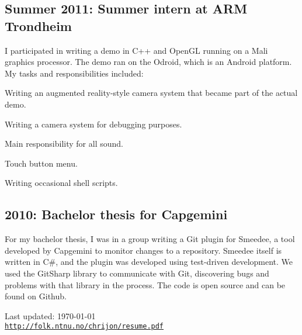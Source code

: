 \documentclass[letterpaper]{article}
\renewenvironment{itemize}{
  \begin{list}{}{
    \setlength{\leftmargin}{1.5em}
  }
}{
  \end{list}
}
\begin{document}
\subsection*{Summer 2011: Summer intern at ARM Trondheim}
I participated in writing a demo in C++ and OpenGL running on a Mali
graphics processor. The demo ran on the Odroid, which is an Android
platform.
My tasks and responsibilities included:
\begin{itemize}
\item Writing an augmented reality-style camera system that became
  part of the actual demo.
\item Writing a camera system for debugging purposes.
\item Main responsibility for all sound.
\item Touch button menu.
\item Writing occasional shell scripts.
\end{itemize}

\subsection*{2010: Bachelor thesis for Capgemini}
For my bachelor thesis, I was in a group writing a Git plugin for Smeedee, a tool developed by Capgemini to monitor
changes to a repository. Smeedee itself is written in C\#, and the
plugin was developed using test-driven development. We used the
GitSharp library to communicate with Git, discovering bugs and problems
with that library in the process. The code is open source and can be
found on Github.

\begin{center}
\begin{footnotesize}
Last updated: \today \\
\href{http://folk.ntnu.no/chrijon/resume.pdf}{\tt http://folk.ntnu.no/chrijon/resume.pdf}
\end{footnotesize}
\end{center}
\end{document}
